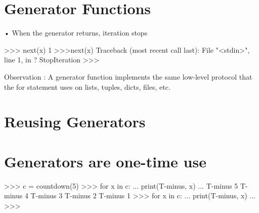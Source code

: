 \documentclass[
  letterpaper,
  DIV=11,
  numbers=noendperiod]{scrreprt}
\newenvironment{Shaded}{\begin{snugshade}}{\end{snugshade}}
\newcommand{\CharTok}[1]{\textcolor[rgb]{0.13,0.47,0.30}{#1}}
\newcommand{\DecValTok}[1]{\textcolor[rgb]{0.68,0.00,0.00}{#1}}
\newcommand{\FunctionTok}[1]{\textcolor[rgb]{0.28,0.35,0.67}{#1}}
\newcommand{\NormalTok}[1]{\textcolor[rgb]{0.00,0.23,0.31}{#1}}
\newcommand{\OperatorTok}[1]{\textcolor[rgb]{0.37,0.37,0.37}{#1}}
\newcommand{\StringTok}[1]{\textcolor[rgb]{0.13,0.47,0.30}{#1}}
\newcommand{\VariableTok}[1]{\textcolor[rgb]{0.07,0.07,0.07}{#1}}
\begin{document}

\chapter{Generator Functions}\label{generator-functions-3}

• When the generator returns, iteration stops

\begin{Shaded}
\begin{Highlighting}[]
\OperatorTok{\textgreater{}\textgreater{}\textgreater{}} \FunctionTok{next(}\CharTok{x}\FunctionTok{)}   
\DecValTok{1}   
\OperatorTok{\textgreater{}\textgreater{}\textgreater{}}\FunctionTok{next(}\CharTok{x}\FunctionTok{)}   
\VariableTok{Traceback} \FunctionTok{(}\CharTok{most} \CharTok{recent} \CharTok{call} \CharTok{last}\FunctionTok{):} \VariableTok{File} \StringTok{"\textless{}stdin\textgreater{}"}\FunctionTok{,} \CharTok{line} \DecValTok{1}\FunctionTok{,} \CharTok{in} \FunctionTok{?}   
\VariableTok{StopIteration}   
\OperatorTok{\textgreater{}\textgreater{}\textgreater{}} 
\end{Highlighting}
\end{Shaded}

Observation : A generator function implements the same low-level
protocol that the for statement uses on lists, tuples, dicts, files,
etc.


\chapter{Reusing Generators}\label{reusing-generators}


\chapter{Generators are one-time use}\label{generators-are-one-time-use}

\begin{Shaded}
\begin{Highlighting}[]
\NormalTok{\textgreater{}\textgreater{}\textgreater{} c = countdown(5)  }
\NormalTok{\textgreater{}\textgreater{}\textgreater{} for x in c:  }
\NormalTok{... print(\textquotesingle{}T{-}minus\textquotesingle{}, x)  }
\NormalTok{...  }
\NormalTok{T{-}minus 5  }
\NormalTok{T{-}minus 4  }
\NormalTok{T{-}minus 3  }
\NormalTok{T{-}minus 2  }
\NormalTok{T{-}minus 1  }
\NormalTok{\textgreater{}\textgreater{}\textgreater{} for x in c:  }
\NormalTok{... print(\textquotesingle{}T{-}minus\textquotesingle{}, x)  }
\NormalTok{...  }
\NormalTok{\textgreater{}\textgreater{}\textgreater{} }
\end{Highlighting}
\end{Shaded}
\end{document}
